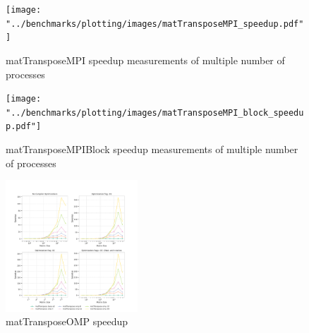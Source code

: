 \documentclass[conference]{IEEEtran}
\begin{document}
\begin{figure}[htb]
	\centering
	\texttt{[image: "../benchmarks/plotting/images/matTransposeMPI\_speedup.pdf"]}
	\caption{matTransposeMPI speedup measurements of multiple number of processes}
	\label{fig:transpose_mpi_speedup}
\end{figure}

\begin{figure}[htb]
	\centering
	\texttt{[image: "../benchmarks/plotting/images/matTransposeMPI\_block\_speedup.pdf"]}
	\caption{matTransposeMPIBlock speedup measurements of multiple number of processes}
	\label{fig:transpose_mpi_block_speedup}
\end{figure}

\begin{figure}[htb]
	\centering
	\includegraphics[width=0.44\textwidth]{"../benchmarks/plotting/images/transpose_explicit_speedup.pdf"}
	\caption{matTransposeOMP speedup}
	\label{fig:transpose_mp_speedup}
\end{figure}

\end{document}
